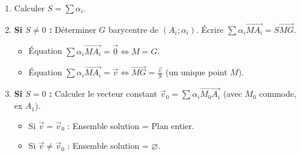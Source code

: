 \documentclass[11pt]{article}
\begin{document}
\begin{methode}[Réduire $\sum \alpha_i \overrightarrow{MA_i}$ et résoudre $\sum \alpha_i \overrightarrow{MA_i} = \vec{v}$]
\begin{enumerate}
    \item Calculer $S = \sum \alpha_i$.
    \item \textbf{Si $S \neq 0$ :} Déterminer $G$ barycentre de $(A_i;\alpha_i)$. Écrire $\sum \alpha_i \overrightarrow{MA_i} = S \overrightarrow{MG}$.
    \begin{itemize}
        \item Équation $\sum \alpha_i \overrightarrow{MA_i} = \vec{0} \iff M=G$.
        \item Équation $\sum \alpha_i \overrightarrow{MA_i} = \vec{v} \iff \overrightarrow{MG} = \frac{\vec{v}}{S}$ (un unique point $M$).
    \end{itemize}
    \item \textbf{Si $S = 0$ :} Calculer le vecteur constant $\vec{v}_0 = \sum \alpha_i \overrightarrow{M_0A_i}$ (avec $M_0$ commode, ex $A_1$).
    \begin{itemize}
        \item Si $\vec{v} = \vec{v}_0$ : Ensemble solution = Plan entier.
        \item Si $\vec{v} \neq \vec{v}_0$ : Ensemble solution = $\varnothing$.
    \end{itemize}
\end{enumerate}
\end{methode}
\end{document}
